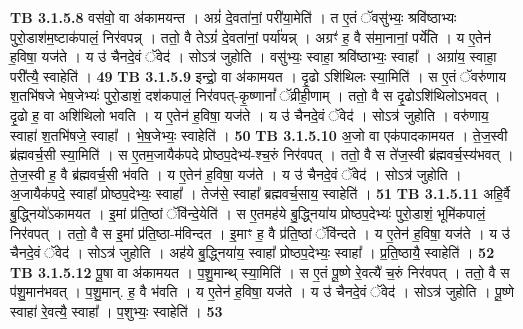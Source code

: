 \documentclass[17pt]{extarticle}
\begin{document}
{{                  \newline
                                \textbf{ TB 3.1.5.8} \newline
                  वस॑वो॒ वा अ॑कामयन्त । अग्रं॑ दे॒वता॑नां॒ परी॑या॒मेति॑ । त ए॒तं ॅवसु॑भ्यः॒ श्रवि॑ष्ठाभ्यः पुरो॒डाश॑म॒ष्टाक॑पालं॒ निर॑वपन्न् । ततो॒ वै तेऽग्रं॑ दे॒वता॑नां॒ पर्या॑यन्न् । अग्रꣳ॑ ह॒ वै स॑मा॒नानां॒ पर्ये॑ति । य ए॒तेन॑ ह॒विषा॒ यज॑ते । य उ॑ चैनदे॒वं ॅवेद॑ । सोऽत्र॑ जुहोति । वसु॑भ्यः॒ स्वाहा॒ श्रवि॑ष्ठाभ्यः॒ स्वाहा᳚ । अग्रा॑य॒ स्वाहा॒ परी᳚त्यै॒ स्वाहेति॑ । \textbf{ 49} \newline
                  \newline
                                \textbf{ TB 3.1.5.9} \newline
                  इन्द्रो॒ वा अ॑कामयत । दृ॒ढो ऽशि॑थिलः स्या॒मिति॑ । स ए॒तं ॅवरु॑णाय श॒तभि॑षजे भेष॒जेभ्यः॑ पुरो॒डाशं॒ दश॑कपालं॒ निर॑वपत्-कृ॒ष्णानां᳚ ॅव्रीही॒णाम् । ततो॒ वै स दृ॒ढोऽशि॑थिलोऽभवत् । दृ॒ढो ह॒ वा अशि॑थिलो भवति । य ए॒तेन॑ ह॒विषा॒ यज॑ते । य उ॑ चैनदे॒वं ॅवेद॑ । सोऽत्र॑ जुहोति । वरु॑णाय॒ स्वाहा॑ श॒तभि॑षजे॒ स्वाहा᳚ । भे॒ष॒जेभ्यः॒ स्वाहेति॑ । \textbf{ 50} \newline
                  \newline
                                \textbf{ TB 3.1.5.10} \newline
                  अ॒जो वा एक॑पादकामयत । ते॒ज॒स्वी ब्र॑ह्मवर्च॒सी स्या॒मिति॑ । स ए॒तम॒जायैक॑पदे प्रोष्ठप॒देभ्य॑-श्च॒रुं निर॑वपत् । ततो॒ वै स ते॑ज॒स्वी ब्र॑ह्मवर्च॒स्य॑भवत् । ते॒ज॒स्वी ह॒ वै ब्र॑ह्मवर्च॒सी भ॑वति । य ए॒तेन॑ ह॒विषा॒ यज॑ते । य उ॑ चैनदे॒वं ॅवेद॑ । सोऽत्र॑ जुहोति । अ॒जायैक॑पदे॒ स्वाहा᳚ प्रोष्ठप॒देभ्यः॒ स्वाहा᳚ । तेज॑से॒ स्वाहा᳚ ब्रह्मवर्च॒साय॒ स्वाहेति॑ । \textbf{ 51} \newline
                  \newline
                                \textbf{ TB 3.1.5.11} \newline
                  अहि॒र्वै बु॒द्ध्नियो॑ऽकामयत । इ॒मां प्र॑ति॒ष्ठां ॅवि॑न्दे॒येति॑ । स ए॒तमह॑ये बु॒द्ध्निया॑य प्रोष्ठप॒देभ्यः॑ पुरो॒डाशं॒ भूमि॑कपालं॒ निर॑वपत् । ततो॒ वै स इ॒मां प्र॑ति॒ष्ठा-म॑विन्दत । इ॒माꣳ ह॒ वै प्र॑ति॒ष्ठां ॅवि॑न्दते । य ए॒तेन॑ ह॒विषा॒ यज॑ते । य उ॑ चैनदे॒वं ॅवेद॑ । सोऽत्र॑ जुहोति । अह॑ये बु॒द्ध्निया॑य॒ स्वाहा᳚ प्रोष्ठप॒देभ्यः॒ स्वाहा᳚ । प्र॒ति॒ष्ठायै॒ स्वाहेति॑ । \textbf{ 52} \newline
                  \newline
                                \textbf{ TB 3.1.5.12} \newline
                  पू॒षा वा अ॑कामयत । प॒शु॒मान्थ् स्या॒मिति॑ । स ए॒तं पू॒ष्णे रे॒वत्यै॑ च॒रुं निर॑वपत् । ततो॒ वै स प॑शु॒मान॑भवत् । प॒शु॒मान्. ह॒ वै भ॑वति । य ए॒तेन॑ ह॒विषा॒ यज॑ते । य उ॑ चैनदे॒वं ॅवेद॑ । सोऽत्र॑ जुहोति । पू॒ष्णे स्वाहा॑ रे॒वत्यै॒ स्वाहा᳚ । प॒शुभ्यः॒ स्वाहेति॑ । \textbf{ 53} \newline
}}
\end{document}
